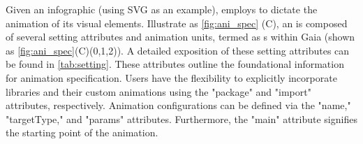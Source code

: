 

Given an infographic (using SVG as an example), \gaia{} employs \aniclass{} to dictate the animation of its visual elements. Illustrate as \autoref{fig:ani_spec} (C), an \aniclass{} is composed of several setting attributes and animation units, termed as \aniunit{}s within Gaia (shown as \autoref{fig:ani_spec}(C)(0,1,2)). A detailed exposition of these setting attributes can be found in \autoref{tab:setting}. 
These attributes outline the foundational information for animation specification. Users have the flexibility to explicitly incorporate libraries and their custom animations using the "package" and "import" attributes, respectively. Animation configurations can be defined via the "name," "targetType," and "params" attributes. Furthermore, the "main" attribute signifies the starting point of the animation.



